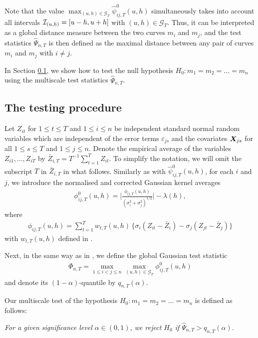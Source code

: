 \documentclass[a4paper,12pt]{article}
\makeatletter
\renewcommand{\eqref}[1]{\tagform@{\ref{#1}}}
\makeatother
\begin{document}
Note that the value $\max_{(u, h) \in \mathcal{G}_T} \hat{\psi}^0_{ij, T}(u, h)$ simultaneously takes into account all intervals $\mathcal{I}_{(u, h)} = [u- h, u+h]$ with $(u, h) \in \mathcal{G}_T$. Thus, it can be interpreted as a global distance measure between the two curves $m_i$ and $m_j$, and the test statistics $\widehat{\Psi}_{n,T}$ is then defined as the maximal distance between any pair of curves $m_i$ and $m_j$ with $i \ne j$.

In Section \ref{subsec:test:test}, we show how to test the null hypothesis $H_0: m_1 =m_2 = \ldots = m_n$ using the multiscale test statistics $\widehat{\Psi}_{n,T}$.

\subsection{The testing procedure}\label{subsec:test:test}


Let $Z_{it}$ for $1 \le t \le T$ and $1 \le i \le n$ be independent standard normal random variables which are independent of the error terms $\varepsilon_{js}$ and the covariates $\boldsymbol{X}_{js}$ for all $1 \leq s \leq T $ and $1 \leq j \leq n$. Denote the empirical average of the variables $Z_{i1},\ldots, Z_{iT}$ by $\bar{Z}_{i,T} = T^{-1} \sum_{t=1}^T Z_{it}$. To simplify the notation, we will omit the subscript $T$ in $\bar{Z}_{i,T}$ in what follows. Similarly as with $\hat{\psi}^0_{ij, T}(u, h)$, for each $i$ and $j$, we introduce the normalised and corrected Gaussian kernel averages 
\begin{align}\label{eq:phi_zero_ij}
\phi^0_{ij, T}(u, h) =  \bigg|\frac{\phi_{ij, T}(u, h)}{(\sigma_i^2 + \sigma_j^2)^{1/2}}\bigg| - \lambda(h),
\end{align}
where 
\begin{align}\label{eq:phi_ij}
\phi_{ij, T}(u, h) = \sum\nolimits_{t=1}^T w_{t,T}(u, h) \, \big\{ \sigma_i (Z_{it} - \bar{Z}_i) - \sigma_j (Z_{jt} - \bar{Z}_j) \big\}
\end{align}
with $w_{t, T}(u, h)$ defined in \eqref{eq:weights}. 

Next, in the same way as in \eqref{eq:Psi_hat}, we define the global Gaussian test statistic
\begin{align}\label{eq:Phi}
\Phi_{n,T} = \max_{1 \le i < j \le n}\max_{(u, h) \in \mathcal{G}_T} \phi^0_{ij, T}(u, h)
\end{align}
and denote its $(1-\alpha)$-quantile by $q_{n,T}(\alpha)$.

Our multiscale test of the hypothesis $H_0: m_1 = m_2 = \ldots = m_n$ is defined as follows: 
\begin{center}
\begin{minipage}[c][0.75cm][c]{13cm}
\textit{For a given significance level $\alpha \in (0,1)$, we reject $H_0$ if $\widehat{\Psi}_{n,T} > q_{n,T}(\alpha)$.}
\end{minipage}
\end{center}
\end{document}
